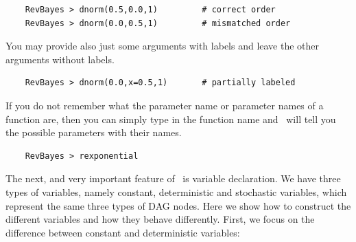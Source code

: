 \documentclass[11pt]{article}
\begin{document}
{\tt \begin{snugshade*}
\begin{lstlisting}    
    RevBayes > dnorm(0.5,0.0,1)         # correct order
    RevBayes > dnorm(0.0,0.5,1)         # mismatched order
\end{lstlisting}
\end{snugshade*}}
You may provide also just some arguments with labels and leave the other arguments without labels.
{\tt \begin{snugshade*}
\begin{lstlisting}    
    RevBayes > dnorm(0.0,x=0.5,1)       # partially labeled
\end{lstlisting}
\end{snugshade*}}
If you do not remember what the parameter name or parameter names of a function are, then you can simply type in the function name and \RevBayes~will tell you the possible parameters with their names.
{\tt \begin{snugshade*}
\begin{lstlisting}    
    RevBayes > rexponential
\end{lstlisting}
\end{snugshade*}}

The next, and very important feature of \RevBayes~is variable declaration. 
We have three types of variables, namely constant, deterministic and stochastic variables, which represent the same three types of DAG nodes. 
Here we show how to construct the different variables and how they behave differently. 
First, we focus on the difference between constant and deterministic variables: 
\end{document}
